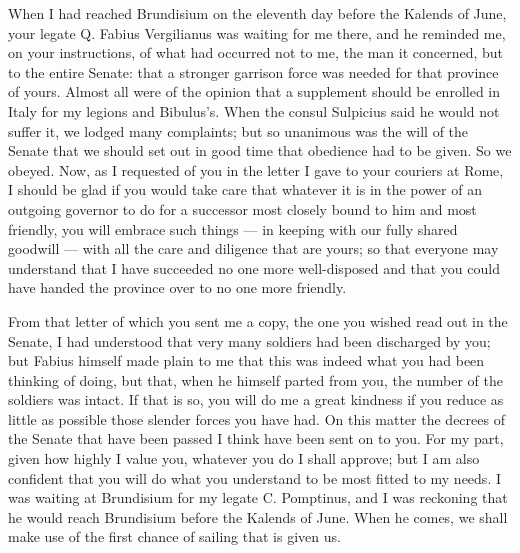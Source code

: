 

 When I had reached Brundisium on the eleventh day before the Kalends of June, your legate Q. Fabius Vergilianus was waiting for me there, and he reminded me, on your instructions, of what had occurred not to me, the man it concerned, but to the entire Senate: that a stronger garrison force was needed for that province of yours. Almost all were of the opinion that a supplement should be enrolled in Italy for my legions and Bibulus's. When the consul Sulpicius said he would not suffer it, we lodged many complaints; but so unanimous was the will of the Senate that we should set out in good time that obedience had to be given. So we obeyed. Now, as I requested of you in the letter I gave to your couriers at Rome, I should be glad if you would take care that whatever it is in the power of an outgoing governor to do for a successor most closely bound to him and most friendly, you will embrace such things --- in keeping with our fully shared goodwill --- with all the care and diligence that are yours; so that everyone may understand that I have succeeded no one more well-disposed and that you could have handed the province over to no one more friendly.

 From that letter of which you sent me a copy, the one you wished read out in the Senate, I had understood that very many soldiers had been discharged by you; but Fabius himself made plain to me that this was indeed what you had been thinking of doing, but that, when he himself parted from you, the number of the soldiers was intact. If that is so, you will do me a great kindness if you reduce as little as possible those slender forces you have had. On this matter the decrees of the Senate that have been passed I think have been sent on to you. For my part, given how highly I value you, whatever you do I shall approve; but I am also confident that you will do what you understand to be most fitted to my needs. I was waiting at Brundisium for my legate C. Pomptinus, and I was reckoning that he would reach Brundisium before the Kalends of June. When he comes, we shall make use of the first chance of sailing that is given us.

